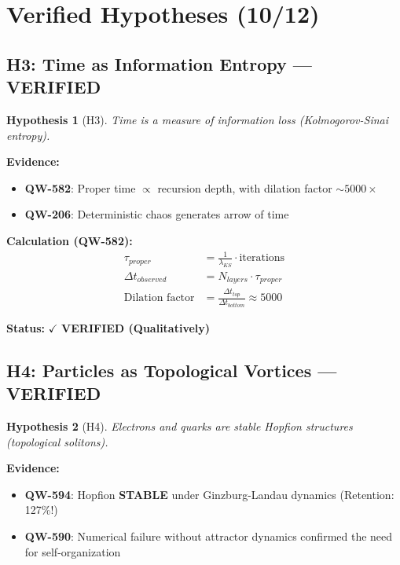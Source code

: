 \documentclass[11pt,a4paper]{book}
\newtheorem{hypothesis}{Hypothesis}[section]
\theoremstyle{remark}
\newcommand{\QW}[1]{\textbf{QW-#1}}
\begin{document}
\section{Verified Hypotheses (10/12)}

\subsection{H3: Time as Information Entropy --- VERIFIED}

\begin{hypothesis}[H3]
Time is a measure of information loss (Kolmogorov-Sinai entropy).
\end{hypothesis}

\textbf{Evidence:}
\begin{itemize}
    \item \QW{582}: Proper time $\propto$ recursion depth, with dilation factor $\sim 5000\times$
    \item \QW{206}: Deterministic chaos generates arrow of time
\end{itemize}

\textbf{Calculation (\QW{582}):}
\begin{align}
\tau_{proper} &= \frac{1}{\lambda_{KS}} \cdot \text{iterations} \\
\Delta t_{observed} &= N_{layers} \cdot \tau_{proper} \\
\text{Dilation factor} &= \frac{\Delta t_{top}}{\Delta t_{bottom}} \approx 5000
\end{align}

\textbf{Status:} $\checkmark$ \textbf{VERIFIED (Qualitatively)}

\subsection{H4: Particles as Topological Vortices --- VERIFIED}

\begin{hypothesis}[H4]
Electrons and quarks are stable Hopfion structures (topological solitons).
\end{hypothesis}

\textbf{Evidence:}
\begin{itemize}
    \item \QW{594}: Hopfion \textbf{STABLE} under Ginzburg-Landau dynamics (Retention: 127\%!)
    \item \QW{590}: Numerical failure without attractor dynamics confirmed the need for self-organization
\end{itemize}
\end{document}
